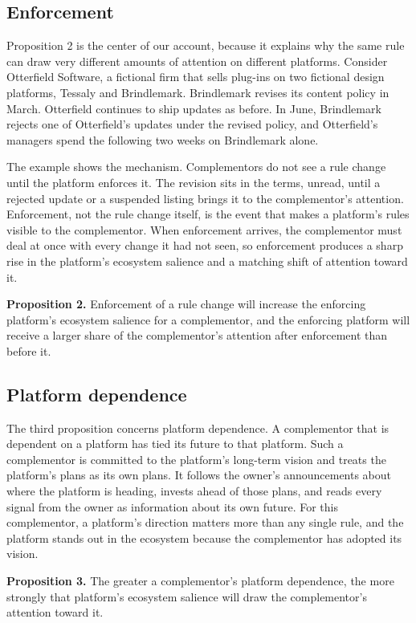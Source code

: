 \documentclass[12pt]{article}
\begin{document}
\subsection{Enforcement}

Proposition 2 is the center of our account, because it explains why the same rule can draw very different amounts of attention on different platforms. Consider Otterfield Software, a fictional firm that sells plug-ins on two fictional design platforms, Tessaly and Brindlemark. Brindlemark revises its content policy in March. Otterfield continues to ship updates as before. In June, Brindlemark rejects one of Otterfield's updates under the revised policy, and Otterfield's managers spend the following two weeks on Brindlemark alone.

The example shows the mechanism. Complementors do not see a rule change until the platform enforces it. The revision sits in the terms, unread, until a rejected update or a suspended listing brings it to the complementor's attention. Enforcement, not the rule change itself, is the event that makes a platform's rules visible to the complementor. When enforcement arrives, the complementor must deal at once with every change it had not seen, so enforcement produces a sharp rise in the platform's ecosystem salience and a matching shift of attention toward it.

\textbf{Proposition 2.} Enforcement of a rule change will increase the enforcing platform's ecosystem salience for a complementor, and the enforcing platform will receive a larger share of the complementor's attention after enforcement than before it.

\subsection{Platform dependence}

The third proposition concerns platform dependence. A complementor that is dependent on a platform has tied its future to that platform. Such a complementor is committed to the platform's long-term vision and treats the platform's plans as its own plans. It follows the owner's announcements about where the platform is heading, invests ahead of those plans, and reads every signal from the owner as information about its own future. For this complementor, a platform's direction matters more than any single rule, and the platform stands out in the ecosystem because the complementor has adopted its vision.

\textbf{Proposition 3.} The greater a complementor's platform dependence, the more strongly that platform's ecosystem salience will draw the complementor's attention toward it.
\end{document}
